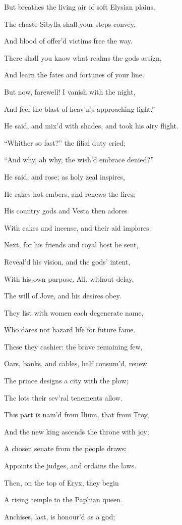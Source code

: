 But breathes the living air of soft Elysian plains.

The chaste Sibylla shall your steps convey,

And blood of offer’d victims free the way.

There shall you know what realms the gods assign,

And learn the fates and fortunes of your line.

But now, farewell! I vanish with the night,

And feel the blast of heav’n’s approaching light.”

He said, and mix’d with shades, and took his airy flight.

“Whither so fast?” the filial duty cried;

“And why, ah why, the wish’d embrace denied?”

He said, and rose; as holy zeal inspires,

He rakes hot embers, and renews the fires;

His country gods and Vesta then adores

With cakes and incense, and their aid implores.

Next, for his friends and royal host he sent,

Reveal’d his vision, and the gods’ intent,

With his own purpose. All, without delay,

The will of Jove, and his desires obey.

They list with women each degenerate name,

Who dares not hazard life for future fame.

These they cashier: the brave remaining few,

Oars, banks, and cables, half consum’d, renew.

The prince designs a city with the plow;

The lots their sev’ral tenements allow.

This part is nam’d from Ilium, that from Troy,

And the new king ascends the throne with joy;

A chosen senate from the people draws;

Appoints the judges, and ordains the laws.

Then, on the top of Eryx, they begin

A rising temple to the Paphian queen.

Anchises, last, is honour’d as a god;

